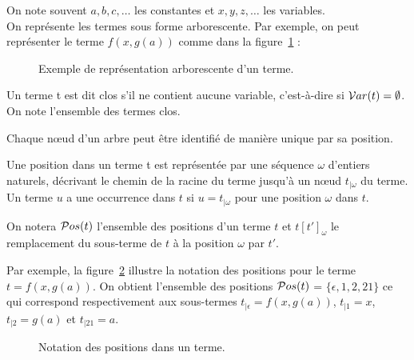 On note souvent $a,b,c,\ldots$ les constantes et $x,y,z,\ldots$ les
variables.\\
On représente les termes sous forme arborescente. Par exemple, 
on peut
représenter le terme $f(x,g(a))$ comme dans la figure~\ref{fig:ex_terme} :
\begin{figure}[H]
  \begin{center}
  
    \caption{Exemple de représentation arborescente d'un terme.}
    \label{fig:ex_terme}
  \end{center}
\end{figure}


\begin{definition}
Un terme t est dit clos s'il ne contient aucune variable, c'est-à-dire si $\mathcal{V} ar(t) = \emptyset$. On note \TF l'ensemble des termes clos.
\end{definition}

Chaque nœud d'un arbre peut être identifié de manière unique par sa position.

\begin{definition}[Position]
Une position dans un terme t est représentée par une séquence $\omega$
d'entiers naturels, décrivant le chemin de la racine du terme jusqu'à un nœud
$t_{|\omega}$ du terme. Un terme $u$ a une occurrence dans $t$ si $u =
t_{|\omega}$ pour une position $\omega$ dans $t$.
\end{definition}
On notera ${\mathcal{P}}os(t)$ l'ensemble des positions d'un terme $t$ et
$t[t']_{\omega}$ le remplacement du sous-terme de $t$ à la position $\omega$
par $t'$.

Par exemple, la figure~\ref{fig:ex_positions} illustre la notation des
positions pour le terme $t = f(x,g(a))$. On obtient l'ensemble des positions
${\mathcal{P}}os(t)$ = $\{\epsilon, 1, 2, 21\}$ ce qui correspond respectivement aux
sous-termes $t_{|\epsilon} = f(x,g(a))$, $t_{|1} = x$, $t_{|2} = g(a)$ et
$t_{|21} = a$.

\begin{figure}[H]
  \begin{center}
  
    \caption{Notation des positions dans un terme.}
    \label{fig:ex_positions}
  \end{center}
\end{figure}



